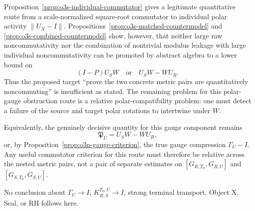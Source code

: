\begin{remark}
\label{rem:o3s-firewall}
Proposition~\ref{prop:o3s-individual-commutator} gives a legitimate quantitative route
from a scale-normalized square-root commutator to individual polar activity
$\|U_X-I\|$.  Propositions~\ref{prop:o3s-matched-countermodel} and
\ref{prop:o3s-combined-countermodel} show, however, that neither large raw
noncommutativity nor the combination of nontrivial modulus leakage with large
individual noncommutativity can be promoted by abstract algebra to a lower bound on
\[
 (I-P)U_SW
 \quad\text{or}\quad
 U_SW-WU_R.
\]
Thus the proposed target ``prove the two concrete metric pairs are quantitatively
noncommuting'' is insufficient as stated.  The remaining problem for this
polar-gauge obstruction route is a relative polar-compatibility problem: one must
detect a failure of the source and target polar rotations to intertwine under $W$.

Equivalently, the genuinely decisive quantity for this gauge component remains
\[
 \mathfrak P_U=U_SW-WU_R,
\]
or, by Proposition~\ref{prop:o3n-gauge-criterion}, the true gauge compression
$\Gamma_U-I$.  Any useful commutator criterion for this route must therefore be
relative across the nested metric pairs, not a pair of separate estimates on
$[G_{R,T_0},G_{R,U}]$ and $[G_{S,T_0},G_{S,U}]$.

No conclusion about $\Gamma_U\to I$, $K_{R,S}^{T_0,U}\to I$, strong terminal
transport, Object X, Seal, or RH follows here.
\end{remark}

